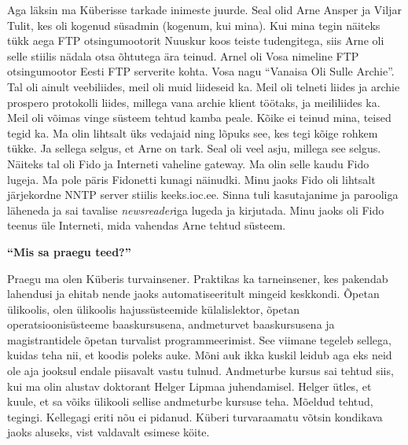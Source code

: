 Aga läksin ma Küberisse tarkade inimeste juurde. Seal olid Arne
Ansper ja Viljar Tulit, kes oli kogenud süsadmin
(kogenum, kui mina). Kui mina tegin näiteks tükk aega FTP otsingumootorit
Nuuskur koos teiste tudengitega, siis Arne oli selle stiilis
nädala otsa õhtutega ära teinud. Arnel oli Vosa nimeline FTP
otsingumootor Eesti FTP serverite kohta. Vosa nagu \enquote{Vanaisa Oli Sulle
Archie}. Tal oli ainult veebiliides, meil oli
muid liideseid ka. Meil oli telneti liides ja archie prospero
protokolli liides, millega
vana archie klient töötaks, ja meililiides ka. Meil oli võimas vinge süsteem
tehtud kamba peale. Kõike ei teinud mina, teised tegid ka. Ma olin lihtsalt üks
vedajaid ning lõpuks see, kes tegi kõige rohkem tükke. Ja sellega selgus, et
Arne on tark. Seal oli veel asju, millega see selgus. Näiteks tal oli Fido ja
Interneti vaheline gateway. Ma olin selle kaudu
Fido lugeja. Ma pole päris Fidonetti kunagi
näinudki. Minu jaoks Fido oli lihtsalt järjekordne
NNTP server stiilis
keeks.ioc.ee. Sinna tuli kasutajanime ja parooliga
läheneda ja sai tavalise \emph{newsreader}iga lugeda ja kirjutada. Minu jaoks
oli Fido teenus üle Interneti, mida vahendas Arne tehtud süsteem.

\textbf{\enquote{Mis sa praegu teed?}}

Praegu ma olen Küberis turvainsener. Praktikas ka
tarneinsener, kes pakendab lahendusi ja ehitab nende jaoks automatiseeritult
mingeid keskkondi.  Õpetan ülikoolis, olen ülikoolis
hajussüsteemide külalislektor, õpetan operatsioonisüsteeme baaskursusena,
andmeturvet baaskursusena ja magistrantidele õpetan turvalist programmeerimist.
See viimane tegeleb sellega, kuidas teha nii, et koodis poleks auke. Mõni auk
ikka kuskil leidub aga eks neid ole aja jooksul endale piisavalt vastu tulnud.
Andmeturbe kursus sai tehtud siis, kui ma olin alustav doktorant Helger
Lipmaa juhendamisel. Helger ütles, et kuule, et sa
võiks ülikooli sellise andmeturbe kursuse teha. Mõeldud tehtud, tegingi.
Kellegagi eriti nõu ei pidanud. Küberi turvaraamatu võtsin kondikava jaoks aluseks,
vist valdavalt esimese köite.


